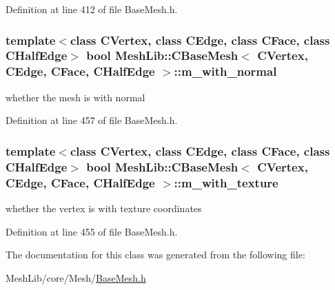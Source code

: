 Definition at line 412 of file Base\+Mesh.\+h.

\subsubsection[{\texorpdfstring{m\+\_\+with\+\_\+normal}{m_with_normal}}]{\setlength{\rightskip}{0pt plus 5cm}template$<$class C\+Vertex, class C\+Edge, class C\+Face, class C\+Half\+Edge$>$ bool {\bf Mesh\+Lib\+::\+C\+Base\+Mesh}$<$ {\bf C\+Vertex}, {\bf C\+Edge}, {\bf C\+Face}, {\bf C\+Half\+Edge} $>$\+::m\+\_\+with\+\_\+normal}\hypertarget{class_mesh_lib_1_1_c_base_mesh_a105ddccad80953028cc54cd317dee8a4}{}\label{class_mesh_lib_1_1_c_base_mesh_a105ddccad80953028cc54cd317dee8a4}
whether the mesh is with normal 

Definition at line 457 of file Base\+Mesh.\+h.

\subsubsection[{\texorpdfstring{m\+\_\+with\+\_\+texture}{m_with_texture}}]{\setlength{\rightskip}{0pt plus 5cm}template$<$class C\+Vertex, class C\+Edge, class C\+Face, class C\+Half\+Edge$>$ bool {\bf Mesh\+Lib\+::\+C\+Base\+Mesh}$<$ {\bf C\+Vertex}, {\bf C\+Edge}, {\bf C\+Face}, {\bf C\+Half\+Edge} $>$\+::m\+\_\+with\+\_\+texture}\hypertarget{class_mesh_lib_1_1_c_base_mesh_a36ba9fb8f3b289de348f1133ee6ab4bb}{}\label{class_mesh_lib_1_1_c_base_mesh_a36ba9fb8f3b289de348f1133ee6ab4bb}
whether the vertex is with texture coordinates 

Definition at line 455 of file Base\+Mesh.\+h.



The documentation for this class was generated from the following file\+:\begin{DoxyCompactItemize}
\item 
Mesh\+Lib/core/\+Mesh/\hyperlink{_base_mesh_8h}{Base\+Mesh.\+h}\end{DoxyCompactItemize}
